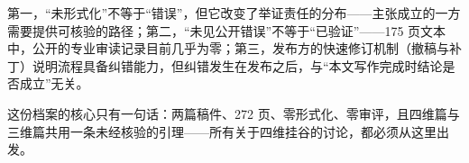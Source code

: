 \begin{cautbox}[边界：三件不能混淆的事]
第一，“未形式化”不等于“错误”，但它改变了举证责任的分布——主张成立的一方需要提供可核验的路径；第二，“未见公开错误”不等于“已验证”——175 页文本中，公开的专业审读记录目前几乎为零；第三，发布方的快速修订机制（撤稿与补丁）说明流程具备纠错能力，但纠错发生在发布之后，与“本文写作完成时结论是否成立”无关。
\end{cautbox}

\begin{keybox}[可记忆主句]
这份档案的核心只有一句话：两篇稿件、272 页、零形式化、零审评，且四维篇与三维篇共用一条未经核验的引理——所有关于四维挂谷的讨论，都必须从这里出发。
\end{keybox}
